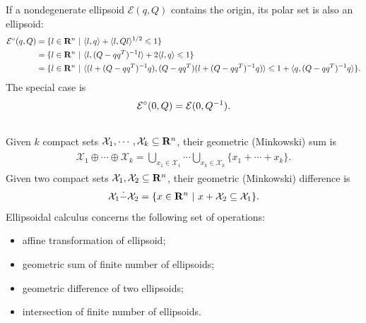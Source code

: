 \documentclass[letterpaper,10pt,english]{sphinxmanual}
\begin{document}
If a nondegenerate ellipsoid ${\mathcal E}(q,Q)$ contains the
origin, its polar set is also an ellipsoid:
\begin{gather}
\begin{split}\begin{aligned}
{\mathcal E}^\circ(q,Q) & = \{l\in{\bf R}^n ~|~ \langle l,q\rangle +
\langle l,Ql\rangle^{1/2}\leqslant1 \}\\
& = \{l\in{\bf R}^n ~|~ \langle l,(Q-qq^T)^{-1}l\rangle +
2\langle l,q\rangle\leqslant1 \}\\
& = \{l\in{\bf R}^n ~|~ \langle(l+(Q-qq^T)^{-1}q),
(Q-qq^T)(l+(Q-qq^T)^{-1}q)\rangle\leqslant1+\langle q,(Q-qq^T)^{-1}q\rangle \}.\end{aligned}\end{split}\notag
\end{gather}
The special case is
\begin{gather}
\begin{split}{\mathcal E}^\circ(0,Q) = {\mathcal E}(0,Q^{-1}).\end{split}\notag\\\begin{split}\end{split}\notag
\end{gather}
Given $k$ compact sets
${\mathcal X}_1, \cdots, {\mathcal X}_k\subseteq{\bf R}^n$, their
geometric (Minkowski) sum is
\label{chap_ellcalc:equation-minksum}\begin{gather}
\begin{split}{\mathcal X}_1\oplus\cdots\oplus{\mathcal X}_k=\bigcup_{x_1\in{\mathcal X}_1}\cdots\bigcup_{x_k\in{\mathcal X}_k}
\{x_1 + \cdots + x_k\} .\end{split}\label{chap_ellcalc-minksum}
\end{gather}
Given two compact sets
${\mathcal X}_1, {\mathcal X}_2 \subseteq{\bf R}^n$, their
geometric (Minkowski) difference is
\label{chap_ellcalc:equation-minkdiff}\begin{gather}
\begin{split}{\mathcal X}_1\dot{-}{\mathcal X}_2 = \{x\in{\bf R}^n ~|~ x + {\mathcal X}_2 \subseteq {\mathcal X}_1 \}.\end{split}\label{chap_ellcalc-minkdiff}
\end{gather}
Ellipsoidal calculus concerns the following set of operations:
\begin{itemize}
\item {} 
affine transformation of ellipsoid;

\item {} 
geometric sum of finite number of ellipsoids;

\item {} 
geometric difference of two ellipsoids;

\item {} 
intersection of finite number of ellipsoids.

\end{itemize}
\end{document}
